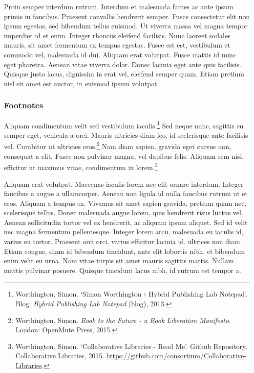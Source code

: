 \documentclass{article}
\begin{document}
Proin semper interdum rutrum. \autocite{https://doi.org/10.5281/zenodo.610760,https://doi.org/10.5281/zenodo.610760} Interdum et malesuada fames ac ante ipsum primis in faucibus. Praesent convallis hendrerit semper. Fusce consectetur elit non ipsum egestas, sed bibendum tellus euismod. \autocite{technische_universitat_munchen_fidus_nodate} Ut viverra massa vel magna tempor imperdiet id et enim. Integer rhoncus eleifend facilisis. Nunc laoreet sodales mauris, sit amet fermentum ex tempus egestas. Fusce est est, vestibulum et commodo vel, malesuada id dui. \autocite{https://doi.org/10.5281/zenodo.19331}  Aliquam erat volutpat. Fusce mattis id nunc eget pharetra. Aenean vitae viverra dolor. Donec lacinia eget ante quis facilisis. Quisque justo lacus, dignissim in erat vel, eleifend semper quam. Etiam pretium nisl sit amet est auctor, in euismod ipsum volutpat. \autocite{https://doi.org/10.5281/zenodo.19731}


\subsubsection{Footnotes}\label{H5724220}



Aliquam condimentum velit sed vestibulum iaculis.\footnote{Worthington, Simon. ‘Simon Worthington › Hybrid Publishing Lab Notepad’. Blog. \emph{Hybrid Publishing Lab Notepad} (blog), 2013.} Sed neque nunc, sagittis eu semper eget, vehicula a orci. Mauris ultricies diam leo, id scelerisque ante facilisis vel. Curabitur ut ultricies eros.\footnote{Worthington, Simon. \emph{Book to the Future - a Book Liberation Manifesto}. London: OpenMute Press, 2015.} Nam diam sapien, gravida eget cursus non, consequat a elit. Fusce non pulvinar magna, vel dapibus felis. Aliquam sem nisi, efficitur ut maximus vitae, condimentum in lorem.\footnote{Worthington, Simon. ‘Collaborative Libraries - Read Me’. Github Repository. Collaborative Libraries, 2015. \href{https://github.com/consortium/Collaborative-Libraries}{https://github.com/consortium/Collaborative-Libraries}.} 


Aliquam erat volutpat. Maecenas iaculis lorem nec elit ornare interdum. Integer faucibus a augue a ullamcorper. Aenean non ligula id nulla faucibus rutrum ut et eros. Aliquam a tempus ex. Vivamus sit amet sapien gravida, pretium quam nec, scelerisque tellus. Donec malesuada augue lorem, quis hendrerit risus luctus vel. Aenean sollicitudin tortor vel ex hendrerit, ac aliquam ipsum aliquet. Sed id velit nec magna fermentum pellentesque. Integer lorem arcu, malesuada eu iaculis id, varius eu tortor. Praesent orci orci, varius efficitur lacinia id, ultrices non diam. Etiam congue, diam id bibendum tincidunt, ante elit lobortis nibh, et bibendum enim velit eu urna. Nam vitae turpis sit amet mauris sagittis mattis. Nullam mattis pulvinar posuere. Quisque tincidunt lacus nibh, id rutrum est tempor a.


\printbibliography[title={Bibliography}]
\end{document}
